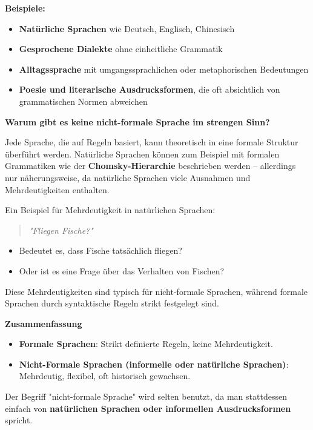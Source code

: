 \documentclass{article}
\begin{document}
\begin{enumerate}
	\textbf{Beispiele:}
	\begin{itemize}
		\item \textbf{Natürliche Sprachen} wie Deutsch, Englisch, Chinesisch
		\item \textbf{Gesprochene Dialekte} ohne einheitliche Grammatik
		\item \textbf{Alltagssprache} mit umgangssprachlichen oder metaphorischen Bedeutungen
		\item \textbf{Poesie und literarische Ausdrucksformen}, die oft absichtlich von grammatischen Normen abweichen
	\end{itemize}
	
	\textbf{Warum gibt es keine nicht-formale Sprache im strengen Sinn?}
	
	Jede Sprache, die auf Regeln basiert, kann theoretisch in eine formale Struktur überführt werden. Natürliche Sprachen können zum Beispiel mit formalen Grammatiken wie der \textbf{Chomsky-Hierarchie} beschrieben werden – allerdings nur näherungsweise, da natürliche Sprachen viele Ausnahmen und Mehrdeutigkeiten enthalten.
	
	Ein Beispiel für Mehrdeutigkeit in natürlichen Sprachen:
	
	\begin{quote}
		\textit{"Fliegen Fische?"}
	\end{quote}
	
	\begin{itemize}
		\item Bedeutet es, dass Fische tatsächlich fliegen?
		\item Oder ist es eine Frage über das Verhalten von Fischen?
	\end{itemize}
	
	Diese Mehrdeutigkeiten sind typisch für nicht-formale Sprachen, während formale Sprachen durch syntaktische Regeln strikt festgelegt sind.
	
	\textbf{Zusammenfassung}
	
	\begin{itemize}
		\item \textbf{Formale Sprachen}: Strikt definierte Regeln, keine Mehrdeutigkeit.
		\item \textbf{Nicht-Formale Sprachen (informelle oder natürliche Sprachen)}: Mehrdeutig, flexibel, oft historisch gewachsen.
	\end{itemize}
	
	Der Begriff "nicht-formale Sprache" wird selten benutzt, da man stattdessen einfach von \textbf{natürlichen Sprachen oder informellen Ausdrucksformen} spricht.
	

\end{enumerate}
\end{document}
